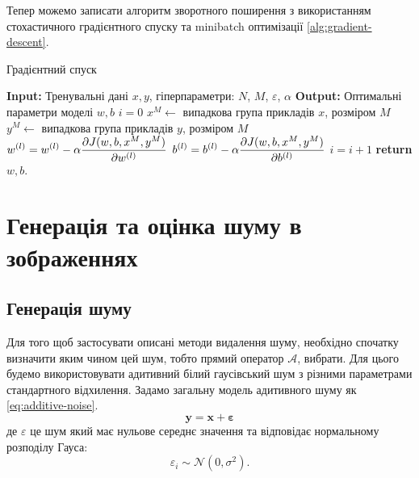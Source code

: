 \documentclass[14pt,a4paper]{extarticle}
\renewcommand{\algorithmicrequire}{\textbf{Input: }}
\renewcommand{\algorithmicensure}{\textbf{Output: }}
\newcommand{\algorithmreturn}{\textbf{return }}
\newcounter{e}
\numberwithin{equation}{section}
\numberwithin{figure}{section}
\begin{document}
	Тепер можемо записати алгоритм зворотного поширення з використанням стохастичного градієнтного спуску та minibatch оптимізації \ref{alg:gradient-descent}.
	\begin{algorithm}[H]
	\caption{Градієнтний спуск}
	\label{alg:gradient-descent}
	\begin{algorithmic}[1]
		\State \algorithmicrequire{Тренувальні дані $x, y$, гіперпараметри: $N$, $M$, $\varepsilon$, $\alpha$}
		\State \algorithmicensure{ Оптимальні параметри моделі $w, b$}
		\State $i = 0$
		\State $x^M \leftarrow$ випадкова група прикладів $x$, розміром $M$
		\State $y^M \leftarrow$ випадкова група прикладів $y$, розміром $M$
		\State $\displaystyle w^{(l)} = w^{(l)} -  \alpha \pdv{J(w, b, x^M, y^M)}{w^{(l)}}$
		\vspace{0.2cm}
		\State $\displaystyle b^{(l)} = b^{(l)} - \alpha \pdv{J(w, b, x^M, y^M)}{b^{(l)}}$
		\State $\displaystyle i = i + 1$
		\EndFor
		\EndWhile
		\State \algorithmreturn{$w, b$}.
	\end{algorithmic}
	\end{algorithm}

	\newpage
	\thispagestyle{empty}
	\section{Генерація та оцінка шуму в зображеннях}
	
	\subsection{Генерація шуму}	
	Для того щоб застосувати описані методи видалення шуму, необхідно спочатку визначити яким чином цей шум, тобто прямий оператор $\mathcal{A}$, вибрати. Для цього будемо використовувати адитивний білий гаусівський шум з різними параметрами стандартного відхилення. Задамо загальну модель адитивного шуму як \ref{eq:additive-noise}.
	\begin{equation}
		\label{eq:additive-noise}
		\mathbf{y}=\mathbf{x} + \mathbf{\varepsilon}
	\end{equation}
	де $\varepsilon$ це шум який має нульове середнє значення та відповідає нормальному розподілу Гауса:
	\begin{equation}
		\varepsilon_{i} \sim \mathcal{N}\left(0, \sigma^{2}\right) .
	\end{equation}
	
\end{document}
